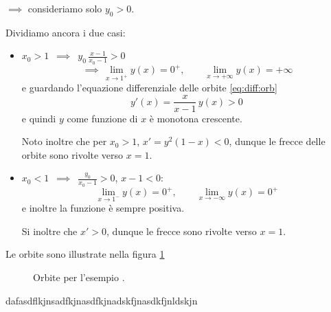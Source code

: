 {\begin{enumerate}
\begin{enumerate}
        $\implies$ consideriamo solo $ y_0 >0$. 

        Dividiamo ancora i due casi: \begin{itemize}
            \item $ x_0>1 $ $ \,\implies\, $ $ \displaystyle y_0\,\frac{x-1}{x_0-1}>0 $\[
                \,\implies\,\lim_{x\to 1^{+}} y(x) = 0^{+},\qquad \lim_{x\to + \infty} y(x) = + \infty
            \]e guardando l'equazione differenziale delle orbite \eqref{eq:diff:orb}\[
                y'(x)=\frac{x}{x-1}\,y(x) >0
            \]e quindi $ y $ come funzione di $ x $ è monotona crescente.
            
            Noto inoltre che per $ x_0>1 $, $ x'=y^{2}(1-x)<0 $, dunque le frecce delle orbite sono rivolte verso $ x=1 $. 
            \item $ x_0<1 $ $ \,\implies\, $ $ \displaystyle \frac{y_0}{x_0-1}>0 $, $ x-1<0 $: \[
                \lim_{x\to 1^{-}} y(x) = 0^{+},\qquad \lim_{x\to - \infty} y(x) = 0^{+}
            \]e inoltre la funzione è sempre positiva. 

            Si inoltre che $ x'>0 $, dunque le frecce sono rivolte verso $ x=1 $.
        \end{itemize}
        Le orbite sono illustrate nella figura \ref{fig:orbitedivattelaapesce}
        \begin{figure}
            \begin{center}
                
            \end{center}
            \caption{Orbite per l'esempio .}\label{fig:orbitedivattelaapesce}
        \end{figure}
    \end{enumerate}
\end{enumerate}
}{dafasdflkjnsadfkjnasdfkjnadskfjnasdkfjnldskjn}{}
